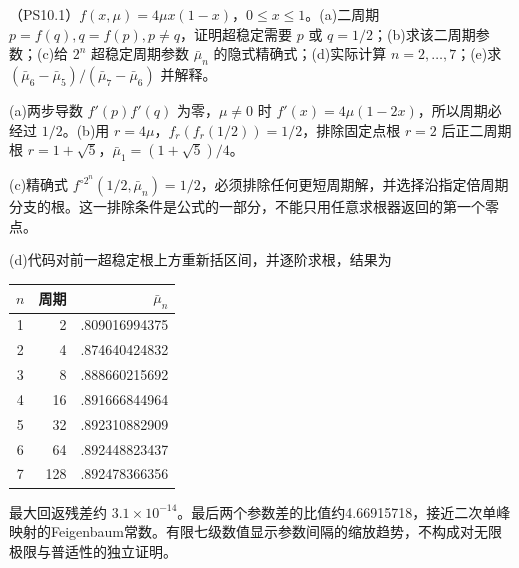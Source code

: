 \begin{exercise}
（PS10.1）$f(x,\mu)=4\mu x(1-x)$，$0\le x\le1$。(a)二周期 $p=f(q),q=f(p),p\ne q$，证明超稳定需要 $p$ 或 $q=1/2$；(b)求该二周期参数；(c)给 $2^n$ 超稳定周期参数 $\bar\mu_n$ 的隐式精确式；(d)实际计算 $n=2,\ldots,7$；(e)求 $(\bar\mu_6-\bar\mu_5)/(\bar\mu_7-\bar\mu_6)$ 并解释。
\end{exercise}
\begin{solution}
(a)两步导数 $f'(p)f'(q)$ 为零，$\mu\ne0$ 时 $f'(x)=4\mu(1-2x)$，所以周期必经过 $1/2$。(b)用 $r=4\mu$，$f_r(f_r(1/2))=1/2$，排除固定点根 $r=2$ 后正二周期根 $r=1+\sqrt5$，$\bar\mu_1=(1+\sqrt5)/4$。

(c)精确式 $f^{\circ2^n}(1/2,\bar\mu_n)=1/2$，必须排除任何更短周期解，并选择沿指定倍周期分支的根。这一排除条件是公式的一部分，不能只用任意求根器返回的第一个零点。

(d)代码对前一超稳定根上方重新括区间，并逐阶求根，结果为
\begin{center}\begin{tabular}{crr}\toprule $n$&周期&$\bar\mu_n$\\\midrule
1&2&.809016994375\\2&4&.874640424832\\3&8&.888660215692\\4&16&.891666844964\\5&32&.892310882909\\6&64&.892448823437\\7&128&.892478366356\\\bottomrule\end{tabular}\end{center}
最大回返残差约 $3.1\times10^{-14}$。最后两个参数差的比值约4.66915718，接近二次单峰映射的Feigenbaum常数。有限七级数值显示参数间隔的缩放趋势，不构成对无限极限与普适性的独立证明。
\end{solution}
